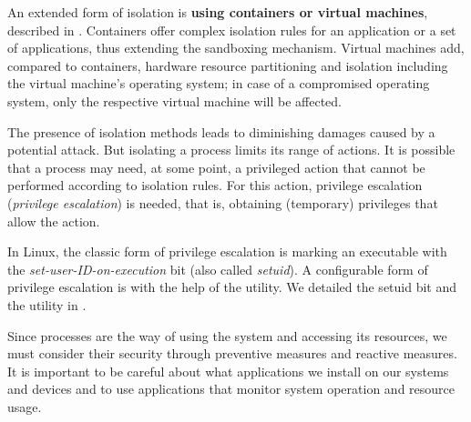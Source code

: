 An extended form of isolation is \textbf{using containers or virtual machines}, described in .
Containers offer complex isolation rules for an application or a set of applications, thus extending the sandboxing mechanism.
Virtual machines add, compared to containers, hardware resource partitioning and isolation including the virtual machine's operating system;
in case of a compromised operating system, only the respective virtual machine will be affected.

The presence of isolation methods leads to diminishing damages caused by a potential attack.
But isolating a process limits its range of actions.
It is possible that a process may need, at some point, a privileged action that cannot be performed according to isolation rules.
For this action, privilege escalation (\textit{privilege escalation}) is needed, that is, obtaining (temporary) privileges that allow the action.

In Linux, the classic form of privilege escalation is marking an executable with the \textit{set-user-ID-on-execution} bit (also called \textit{setuid}).
A configurable form of privilege escalation is with the help of the  utility.
We detailed the setuid bit and the  utility in .

Since processes are the way of using the system and accessing its resources, we must consider their security through preventive measures and reactive measures.
It is important to be careful about what applications we install on our systems and devices and to use applications that monitor system operation and resource usage. 
